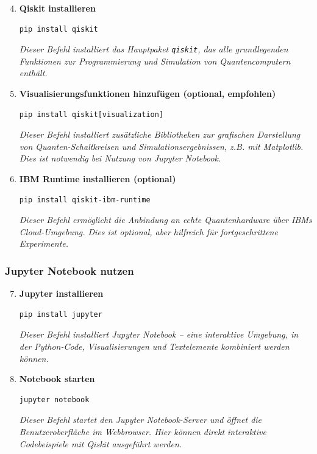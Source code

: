 \begin{enumerate}
    \setcounter{enumi}{3} %
    \item \textbf{Qiskit installieren}
    \begin{verbatim}
pip install qiskit
    \end{verbatim}
\textit{Dieser Befehl installiert das Hauptpaket \texttt{qiskit}, das alle grundlegenden Funktionen zur Programmierung und Simulation von Quantencomputern enthält. }

    \item \textbf{Visualisierungsfunktionen hinzufügen (optional, empfohlen)}
    \begin{verbatim}
pip install qiskit[visualization]
    \end{verbatim}
\textit{Dieser Befehl installiert zusätzliche Bibliotheken zur grafischen Darstellung von Quanten-Schaltkreisen und Simulationsergebnissen, z.B. mit Matplotlib.  Dies ist notwendig bei Nutzung von Jupyter Notebook. }

    \item \textbf{IBM Runtime installieren (optional)}
    \begin{verbatim}
pip install qiskit-ibm-runtime
    \end{verbatim}
\textit{Dieser Befehl ermöglicht die Anbindung an echte Quantenhardware über IBMs Cloud-Umgebung.  Dies ist optional, aber hilfreich für fortgeschrittene Experimente. }
\end{enumerate}

\subsubsection*{Jupyter Notebook nutzen}

\begin{enumerate}
    \setcounter{enumi}{6} %
    \item \textbf{Jupyter installieren}
    \begin{verbatim}
pip install jupyter
    \end{verbatim}
\textit{Dieser Befehl installiert Jupyter Notebook -- eine interaktive Umgebung, in der Python-Code, Visualisierungen und Textelemente kombiniert werden können. }


    \item \textbf{Notebook starten}
    \begin{verbatim}
jupyter notebook
    \end{verbatim}
\textit{Dieser Befehl startet den Jupyter Notebook-Server und öffnet die Benutzeroberfläche im Webbrowser.  Hier können direkt interaktive Codebeispiele mit Qiskit ausgeführt werden. }

\end{enumerate}

